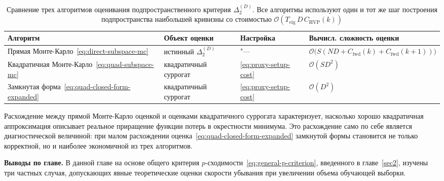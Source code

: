 \begin{table}[ht]
    \centering
    \caption{Сравнение трех алгоритмов оценивания подпространственного критерия $\Delta_2^{(D)}$. Все алгоритмы используют один и тот же шаг построения подпространства наибольшей кривизны со стоимостью $\mathcal O(T_{\mathrm{eig}}\,D\,C_{\mathrm{HVP}}(k))$}
    \label{tab:estimator-summary}
    \begin{tabular}{@{}p{3.5cm} p{3.3cm} p{2.1cm} p{7.2cm}@{}}
        \toprule
        Алгоритм & Объект оценки & Настройка & Вычисл. сложность оценки \\
        \midrule
        Прямая Монте-Карло~\eqref{eq:direct-subspace-mc}
        & истинный $\Delta_2^{(D)}$
        & "---
        & $\mathcal O\bigl(S(ND+C_{\mathrm{fwd}}(k)+C_{\mathrm{fwd}}(k+1))\bigr)$ \\[0.4em]
        Квадратичная Монте-Карло~\eqref{eq:quad-subspace-mc}
        & квадратичный суррогат
        & \eqref{eq:proxy-setup-cost}
        & $\mathcal O(SD^2)$ \\[0.4em]
        Замкнутая форма~\eqref{eq:quad-closed-form-expanded}
        & квадратичный суррогат
        & \eqref{eq:proxy-setup-cost}
        & $\mathcal O(D^2)$ \\
        \bottomrule
    \end{tabular}
\end{table}

Расхождение между прямой Монте-Карло оценкой и оценками квадратичного суррогата характеризует, насколько хорошо квадратичная аппроксимация описывает реальное приращение функции потерь в окрестности минимума. Это расхождение само по себе является диагностической величиной: при малом расхождении оценка~\eqref{eq:quad-closed-form-expanded} замкнутой формы становится не только корректной, но и наиболее экономичной из трех алгоритмов.

\textbf{Выводы по главе.} В данной главе на основе общего критерия $p$-сходимости~\eqref{eq:general-p-criterion}, введенного в главе~\ref{sec2}, изучены три частных случая, допускающих явные теоретические оценки скорости убывания при увеличении объема обучающей выборки.

